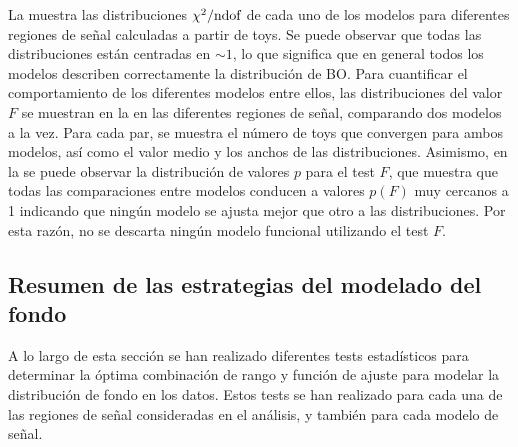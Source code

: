 La \Fig{\ref{fig:bkg:modeling:preparation:ftest:chi2ndof}} muestra las distribuciones \(\chi^{2} / \text{ndof}\) de cada uno de los modelos para diferentes regiones de señal calculadas a partir de toys. Se puede observar que todas las distribuciones están centradas en \(\sim 1\), lo que significa que en general todos los modelos describen correctamente la distribución de \ac{BO}. Para cuantificar el comportamiento de los diferentes modelos entre ellos, las distribuciones del valor \(F\) se muestran en la \Fig{\ref{fig:bkg:modeling:preparation:ftest:ftest}} en las diferentes regiones de señal, comparando dos modelos a la vez. Para cada par, se muestra el número de toys que convergen para ambos modelos, así como el valor medio y los anchos de las distribuciones. Asimismo, en la \Fig{\ref{fig:bkg:modeling:preparation:ftest:ftest_pvalue}} se puede observar la distribución de valores \(p\) para el test \(F\), que muestra que todas las comparaciones entre modelos conducen a valores \(p(F)\) muy cercanos a 1 indicando que ningún modelo se ajusta mejor que otro a las distribuciones. Por esta razón, no se descarta ningún modelo funcional utilizando el test \(F\).





































\subsection{Resumen de las estrategias del modelado del fondo}
\label{subsec:bkg:modeling:strategy_summary}

A lo largo de esta sección se han realizado diferentes tests estadísticos para determinar la óptima combinación de rango y función de ajuste para modelar la distribución de fondo en los datos. Estos tests se han realizado para cada una de las regiones de señal consideradas en el análisis, y también para cada modelo de señal.

